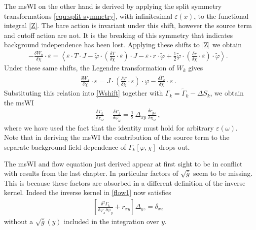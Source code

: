 \documentclass[11pt]{book}
\numberwithin{equation}{chapter}
\begin{document}
The msWI on the other hand is derived by applying the
split symmetry transformations \eqref{equ:split-symmetry},
with infinitesimal $\varepsilon(x)$, to the functional integral \eqref{Z}.
The bare action is invariant under this shift, however the source term and cutoff action are not.
It is the breaking of this symmetry that indicates background independence has been lost.
Applying these shifts to \eqref{Z} we obtain
\begin{align}
	-\frac{\delta W_k}{\delta\chi}\cdot\varepsilon=\left< \varepsilon\cdot T\cdot J-
	\tilde\varphi\cdot\left(\frac{\delta T}{\delta\chi}\cdot\varepsilon\right)\cdot J
	- \varepsilon\cdot r\cdot\tilde\varphi
	+\frac{1}{2}\tilde\varphi\cdot\left(\frac{\delta r}{\delta\chi}\cdot\varepsilon\right)\cdot\tilde\varphi\right>.
	\label{Wshift}
\end{align}
Under these same shifts, the Legendre transformation of $W_k$ gives
\begin{align}
	\frac{\delta W_k}{\delta\chi}\cdot\varepsilon
	= J\cdot\left(\frac{\delta T}{\delta\chi}\cdot\varepsilon\right)\cdot\varphi
	- \frac{\delta\tilde\Gamma_k}{\delta\chi}\cdot\varepsilon \,.
\end{align}
Substituting this relation into \eqref{Wshift} together with
$\Gamma_k = \tilde\Gamma_k - \Delta S_k$,
we obtain the msWI
\begin{align}
	\frac{\delta \Gamma_k}{\delta\chi_\omega}-\frac{\delta \Gamma_k}{\delta\varphi_\omega}=
	\frac{1}{2} \, \Delta_{xy}\,\frac{\delta r_{yx}}{\delta\chi_\omega} \,,
	\label{msWIuntrunc}
\end{align}
where we have used the fact that the identity must hold for arbitrary $\varepsilon(\omega)$.
Note that in deriving the msWI the contribution of the source term to the separate background
field dependence of $\Gamma_k[\varphi,\chi]$ drops out.

The msWI and flow equation just derived
appear at first sight to be in conflict with results from the last chapter.
In particular factors of $\sqrt{\bar g}$ seem to be missing.
This is because these factors are absorbed in a different definition of the inverse kernel.
Indeed the inverse kernel in \eqref{flow1} now satisfies
\begin{align}
  \left[
    \frac{\delta^{2}\Gamma_k}{\delta\varphi_x \delta\varphi_y}+r_{xy}
  \right] \Delta_{yz} =\delta_{xz}
\end{align}
without a $\sqrt{\bar g}(y)$ included in the integration over $y$.
\end{document}
